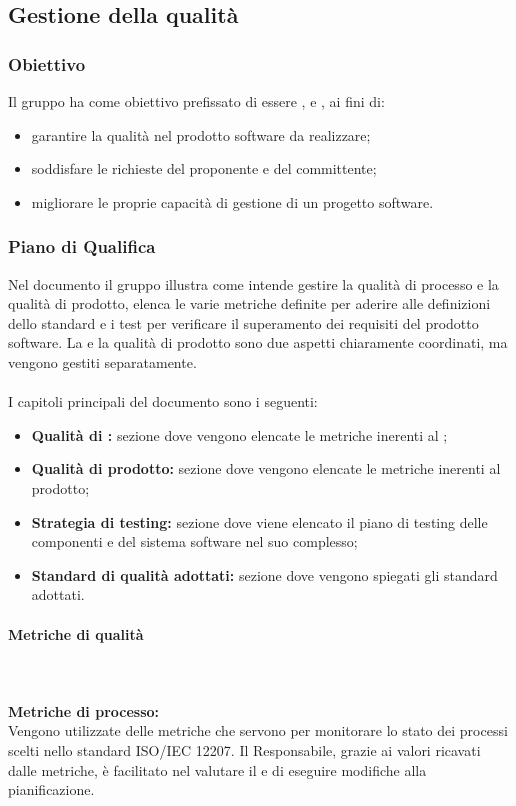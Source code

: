 \subsection{Gestione della qualità}
\subsubsection{Obiettivo}
Il gruppo \Gruppo{} ha come obiettivo prefissato di essere ,  e , ai fini di:
\begin{itemize}
    \item garantire la qualità nel prodotto software da realizzare;
    \item soddisfare le richieste del proponente e del committente;
    \item migliorare le proprie capacità di gestione di un progetto software.
\end{itemize}

\subsubsection{Piano di Qualifica}
Nel documento \PdQ{} il gruppo \Gruppo{} illustra come intende gestire la qualità di processo e la qualità di prodotto, elenca le varie metriche definite per aderire alle definizioni dello standard e i test per verificare il superamento dei requisiti del prodotto software.
La  e la qualità di prodotto sono due aspetti chiaramente coordinati, ma vengono gestiti separatamente. \\ \\
I capitoli principali del documento sono i seguenti:
\begin{itemize}
    \item \textbf{Qualità di :} sezione dove vengono elencate le metriche inerenti al ;
    \item \textbf{Qualità di prodotto:} sezione dove vengono elencate le metriche inerenti al prodotto;
    \item \textbf{Strategia di testing:} sezione dove viene elencato il piano di testing delle componenti e del sistema software nel suo complesso;
    \item \textbf{Standard di qualità adottati:} sezione dove vengono spiegati gli standard adottati.
\end{itemize}

\paragraph{Metriche di qualità}\mbox{}\\ \\
\textbf{Metriche di processo:}\\
Vengono utilizzate delle metriche che servono per monitorare lo stato dei processi scelti nello standard ISO/IEC 12207. Il Responsabile, grazie ai valori ricavati dalle metriche, è facilitato nel
valutare il  e di eseguire modifiche alla pianificazione.\\

